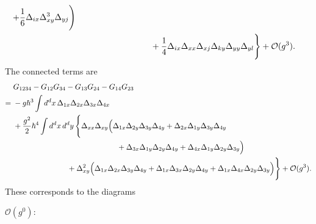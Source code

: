 \begin{enumerate}[label=\alph*)]
\begin{solution}
\begin{equation}
\begin{aligned}
                        +\frac{1}{6}\Delta_{ix}\Delta_{xy}^3\Delta_{yj}
                    \Bigg)\\
                &\hspace{31mm}
                    +\frac{1}{4}\Delta_{ix}\Delta_{xx}\Delta_{xj}
                        \Delta_{ky}\Delta_{yy}\Delta_{yl}
                \Bigg\}+\mathcal O(g^3).
            \end{aligned}
        \end{equation}
        The connected terms are
        \begin{equation}
            \begin{aligned}
                &G_{1234}-G_{12}G_{34}-G_{13}G_{24}-G_{14}G_{23}\\
                ={}&-g\hbar^3\int d^dx\,
                    \Delta_{1x}\Delta_{2x}\Delta_{3x}\Delta_{4x}\\
                &+\frac{g^2}{2}\hbar^4\int d^dx\,d^dy\,\Bigg\{
                    \Delta_{xx}\Delta_{xy}\Big(
                        \Delta_{1x}\Delta_{2y}\Delta_{3y}\Delta_{4y}
                        +\Delta_{2x}\Delta_{1y}\Delta_{3y}\Delta_{4y}\\
                &\hspace{48mm}
                        +\Delta_{3x}\Delta_{1y}\Delta_{2y}\Delta_{4y}
                        +\Delta_{4x}\Delta_{1y}\Delta_{2y}\Delta_{3y}
                    \Big)\\
                &\hspace{25mm}
                    +\Delta_{xy}^2\Big(
                        \Delta_{1x}\Delta_{2x}\Delta_{3y}\Delta_{4y}
                        +\Delta_{1x}\Delta_{3x}\Delta_{2y}\Delta_{4y}
                        +\Delta_{1x}\Delta_{4x}\Delta_{2y}\Delta_{3y}
                    \Big)
                \Bigg\}+\mathcal O(g^3).
            \end{aligned}
        \end{equation}
        These corresponds to the diagrams

        \begin{center}
            $\mathcal O(g^0):\quad$
        \end{center}


\end{solution}
\end{enumerate}
